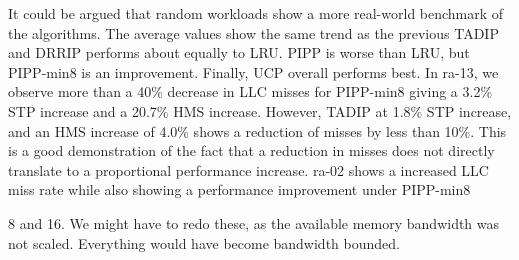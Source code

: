It could be argued that random workloads show a more real-world benchmark of the algorithms.
The average values show the same trend as the previous TADIP and DRRIP performs about equally to LRU.
PIPP is worse than LRU, but PIPP-min8 is an improvement.
Finally, UCP overall performs best.
In ra-13, we observe more than a 40\% decrease in LLC misses for PIPP-min8 giving a 3.2\% STP increase and a 20.7\% HMS increase.
However, TADIP at 1.8\% STP increase, and an HMS increase of 4.0\% shows a reduction of misses by less than 10\%.
This is a good demonstration of the fact that a reduction in misses does not directly translate to a proportional performance increase. 
ra-02 shows a increased LLC miss rate while also showing a performance improvement under PIPP-min8


8 and 16. We might have to redo these, as the available memory bandwidth was not scaled. Everything would have become bandwidth bounded.






